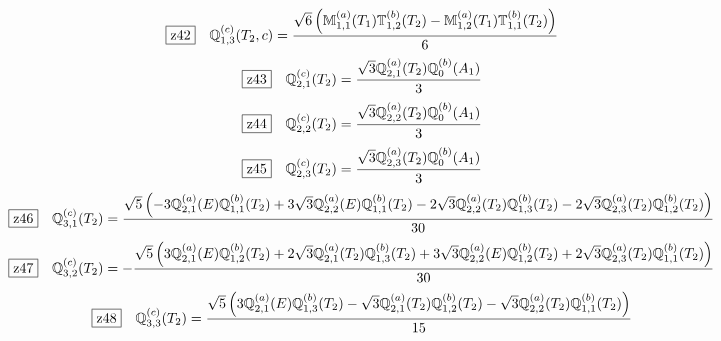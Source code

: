 \documentclass[fleqn,10pt,landscape]{jsarticle}
\begin{document}
\begin{dmath*}
\hspace*{3mm}\fbox{z42}\quad \mathbb{Q}_{1,3}^{(c)}(T_{2},c)=\frac{\sqrt{6} \left(\mathbb{M}_{1,1}^{(a)}(T_{1}) \mathbb{T}_{1,2}^{(b)}(T_{2}) - \mathbb{M}_{1,2}^{(a)}(T_{1}) \mathbb{T}_{1,1}^{(b)}(T_{2})\right)}{6}
\end{dmath*}
\begin{dmath*}
\hspace*{3mm}\fbox{z43}\quad \mathbb{Q}_{2,1}^{(c)}(T_{2})=\frac{\sqrt{3} \mathbb{Q}_{2,1}^{(a)}(T_{2}) \mathbb{Q}_{0}^{(b)}(A_{1})}{3}
\end{dmath*}
\begin{dmath*}
\hspace*{3mm}\fbox{z44}\quad \mathbb{Q}_{2,2}^{(c)}(T_{2})=\frac{\sqrt{3} \mathbb{Q}_{2,2}^{(a)}(T_{2}) \mathbb{Q}_{0}^{(b)}(A_{1})}{3}
\end{dmath*}
\begin{dmath*}
\hspace*{3mm}\fbox{z45}\quad \mathbb{Q}_{2,3}^{(c)}(T_{2})=\frac{\sqrt{3} \mathbb{Q}_{2,3}^{(a)}(T_{2}) \mathbb{Q}_{0}^{(b)}(A_{1})}{3}
\end{dmath*}
\begin{dmath*}
\hspace*{3mm}\fbox{z46}\quad \mathbb{Q}_{3,1}^{(c)}(T_{2})=\frac{\sqrt{5} \left(- 3 \mathbb{Q}_{2,1}^{(a)}(E) \mathbb{Q}_{1,1}^{(b)}(T_{2}) + 3 \sqrt{3} \mathbb{Q}_{2,2}^{(a)}(E) \mathbb{Q}_{1,1}^{(b)}(T_{2}) - 2 \sqrt{3} \mathbb{Q}_{2,2}^{(a)}(T_{2}) \mathbb{Q}_{1,3}^{(b)}(T_{2}) - 2 \sqrt{3} \mathbb{Q}_{2,3}^{(a)}(T_{2}) \mathbb{Q}_{1,2}^{(b)}(T_{2})\right)}{30}
\end{dmath*}
\begin{dmath*}
\hspace*{3mm}\fbox{z47}\quad \mathbb{Q}_{3,2}^{(c)}(T_{2})=- \frac{\sqrt{5} \left(3 \mathbb{Q}_{2,1}^{(a)}(E) \mathbb{Q}_{1,2}^{(b)}(T_{2}) + 2 \sqrt{3} \mathbb{Q}_{2,1}^{(a)}(T_{2}) \mathbb{Q}_{1,3}^{(b)}(T_{2}) + 3 \sqrt{3} \mathbb{Q}_{2,2}^{(a)}(E) \mathbb{Q}_{1,2}^{(b)}(T_{2}) + 2 \sqrt{3} \mathbb{Q}_{2,3}^{(a)}(T_{2}) \mathbb{Q}_{1,1}^{(b)}(T_{2})\right)}{30}
\end{dmath*}
\begin{dmath*}
\hspace*{3mm}\fbox{z48}\quad \mathbb{Q}_{3,3}^{(c)}(T_{2})=\frac{\sqrt{5} \left(3 \mathbb{Q}_{2,1}^{(a)}(E) \mathbb{Q}_{1,3}^{(b)}(T_{2}) - \sqrt{3} \mathbb{Q}_{2,1}^{(a)}(T_{2}) \mathbb{Q}_{1,2}^{(b)}(T_{2}) - \sqrt{3} \mathbb{Q}_{2,2}^{(a)}(T_{2}) \mathbb{Q}_{1,1}^{(b)}(T_{2})\right)}{15}
\end{dmath*}
\vspace{5mm}
\end{document}
